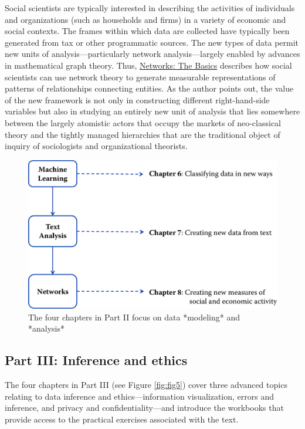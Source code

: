 \documentclass[]{krantz}
\begin{document}
Social scientists are typically interested in describing the activities
of individuals and organizations (such as households and firms) in a
variety of economic and social contexts. The frames within which data
are collected have typically been generated from tax or other
programmatic sources. The new types of data permit new units of
analysis---particularly network analysis---largely enabled by advances
in mathematical graph theory. Thus,
\protect\hyperlink{chap:networks}{Networks: The Basics} describes how
social scientists can use network theory to generate measurable
representations of patterns of relationships connecting entities. As the
author points out, the value of the new framework is not only in
constructing different right-hand-side variables but also in studying an
entirely new unit of analysis that lies somewhere between the largely
atomistic actors that occupy the markets of neo-classical theory and the
tightly managed hierarchies that are the traditional object of inquiry
of sociologists and organizational theorists.

\begin{figure}

{\centering \includegraphics[width=0.7\linewidth]{ChapterIntro/figures/Figure3} 

}

\caption{The four chapters in Part II focus on data *modeling* and *analysis*}\label{fig:fig4}
\end{figure}

\subsection{Part III: Inference and
ethics}\label{part-iii-inference-and-ethics}

The four chapters in Part III (see Figure \ref{fig:fig5}) cover three
advanced topics relating to data inference and ethics---information
visualization, errors and inference, and privacy and
confidentiality---and introduce the workbooks that provide access to the
practical exercises associated with the text.
\end{document}

